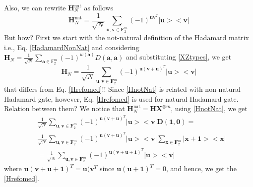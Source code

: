 \documentclass{article}
\begin{document}
	Also, we can rewrite $\mathbf{H}_N^{\text{nat}}$ as follows
\begin{equation}\label{Hrefomed}
	\mathbf{H}_N^{\text{nat}} = \frac{1}{\sqrt{N}} \sum_{\mathbf{u}, \mathbf{v} \in \mathbf{F}_2^m}{\left(-1\right)^{\mathbf{u} \mathbf{v}^T } |\mathbf{u}><\mathbf{v}|}
\end{equation}
	But how? First we start with the not-natural definition of the Hadamard matrix i.e., Eq. \ref{HadamardNonNat} and considering  $\mathbf{H}_N = \frac{1}{\sqrt{N}} \sum_{\mathbf{a} \in \mathbb{F}_2^m} (-1)^{w(\mathbf{a})} D\left( \mathbf{a}, \mathbf{a} \right)$ and substituting \eqref{XZtypes}, we get
	\begin{equation}\label{HnotNat}
		\mathbf{H}_N = \frac{1}{\sqrt{N}} \sum_{\mathbf{u}, \mathbf{v} \in \mathbf{F}_2^m}{\left(-1\right)^{\mathbf{u} (\mathbf{v+u})^T } |\mathbf{u}><\mathbf{v}|}
	\end{equation}
	that differs from	Eq. \eqref{Hrefomed}!! Since \eqref{HnotNat} is related with non-natural Hadamard gate, however, Eq. \eqref{Hrefomed} is used for natural Hadamard gate. Relation between them? We notice that $\mathbf{H}_N^{\text{nat}} = \mathbf{H}\mathbf{X}^{\otimes m}$, using \eqref{HnotNat}, we get
	\begin{align*}
		&\frac{1}{\sqrt{N}} \sum_{\mathbf{u}, \mathbf{v} \in \mathbf{F}_2^m}{\left(-1\right)^{\mathbf{u} (\mathbf{v+u})^T } |\mathbf{u}><\mathbf{v}|}\mathbf{D}(\mathbf{1,0}) = \\
		& \frac{1}{\sqrt{N}} \sum_{\mathbf{u}, \mathbf{v} \in \mathbf{F}_2^m}{\left(-1\right)^{\mathbf{u} (\mathbf{v+u})^T } |\mathbf{u}><\mathbf{v}|}\sum_{\mathbf{x} \in \mathbf{F}_2^m}{ |\mathbf{x+1}><\mathbf{x}|} \\
		& =  \frac{1}{\sqrt{N}} \sum_{\mathbf{u}, \mathbf{v} \in \mathbf{F}_2^m}{\left(-1\right)^{\mathbf{u} (\mathbf{v+u+1})^T } |\mathbf{u}><\mathbf{v}|}
	\end{align*}
	where $\mathbf{u}(\mathbf{v+u+1})^T=\mathbf{u}(\mathbf{v}^T$ since $\mathbf{u}(\mathbf{u+1})^T=0$, and hence, we get the \eqref{Hrefomed}.
	
\end{document}
